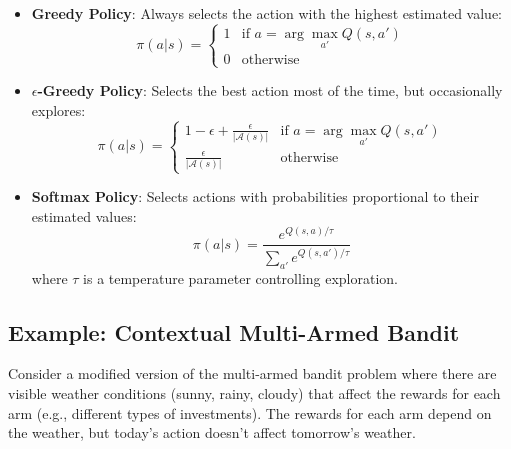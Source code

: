 \documentclass[12pt,a4paper]{article}
\begin{document}
\begin{itemize}
    \item \textbf{Greedy Policy}: Always selects the action with the highest estimated value:
    \begin{equation}
    \pi(a|s) = 
    \begin{cases}
    1 & \text{if } a = \arg\max_{a'} Q(s,a') \\
    0 & \text{otherwise}
    \end{cases}
    \end{equation}
    
    \item \textbf{$\epsilon$-Greedy Policy}: Selects the best action most of the time, but occasionally explores:
    \begin{equation}
    \pi(a|s) = 
    \begin{cases}
    1 - \epsilon + \frac{\epsilon}{|\mathcal{A}(s)|} & \text{if } a = \arg\max_{a'} Q(s,a') \\
    \frac{\epsilon}{|\mathcal{A}(s)|} & \text{otherwise}
    \end{cases}
    \end{equation}
    
    \item \textbf{Softmax Policy}: Selects actions with probabilities proportional to their estimated values:
    \begin{equation}
    \pi(a|s) = \frac{e^{Q(s,a)/\tau}}{\sum_{a'} e^{Q(s,a')/\tau}}
    \end{equation}
    where $\tau$ is a temperature parameter controlling exploration.
\end{itemize}

\subsection{Example: Contextual Multi-Armed Bandit}

Consider a modified version of the multi-armed bandit problem where there are visible weather conditions (sunny, rainy, cloudy) that affect the rewards for each arm (e.g., different types of investments). The rewards for each arm depend on the weather, but today's action doesn't affect tomorrow's weather.
\end{document}
